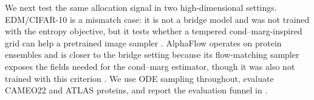 \documentclass{article}
\theoremstyle{plain}
\theoremstyle{definition}
\theoremstyle{remark}
\begin{document}
We next test the same allocation signal in two high-dimensional settings. EDM/CIFAR-10 is a mismatch case: it is not a bridge model and was not trained with the entropy objective, but it tests whether a tempered cond--marg-inspired grid can help a pretrained image sampler \citep{karras2022edm}. AlphaFlow operates on protein ensembles and is closer to the bridge setting because its flow-matching sampler exposes the fields needed for the cond--marg estimator, though it was also not trained with this criterion \citep{jing2024alphafoldmeetsflowmatching}. We use ODE sampling throughout, evaluate CAMEO22 and ATLAS proteins\citep{ha2015cameo, stam2024atlas}, and report the evaluation funnel in .



\end{document}
